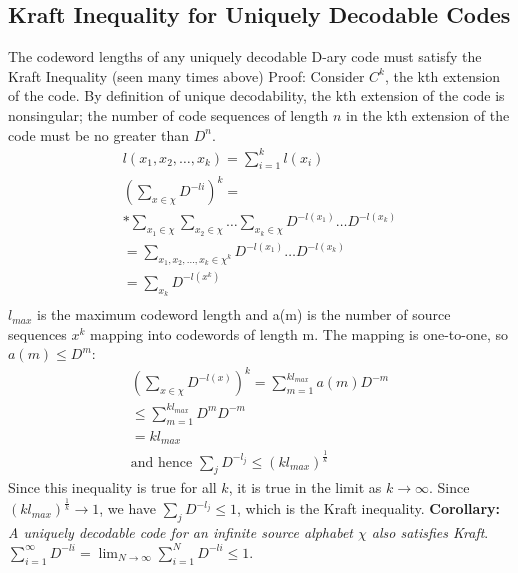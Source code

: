 \documentclass[10pt]{article}
\begin{document}
\begin{tiny}
\begin{multicols}{3}
\section*{Kraft Inequality for Uniquely Decodable Codes}
\thm[McMillan] \label{thm: mcmillan}
The codeword lengths of any uniquely decodable D-ary code must satisfy the Kraft Inequality (seen many times above) \newline
Proof: \newline
Consider ${C^{k}}$, the kth extension of the code. By definition of unique decodability, the kth extension of the code is nonsingular; 
the number of code sequences of length ${n}$ in the kth extension of the code must be no greater than ${D^{n}}$. 
\begin{eqnarray}
l({x_1},{x_2}, \ldots , {x_k}) = \sum_{i=1}^{k} l({x_i})\\
(\sum_{x\in \chi} D^{-li})^{k} = \\*
\sum_{x_1\in\chi}\sum_{x_2\in\chi} \ldots \sum_{x_k\in\chi}  D^{-l({x_1})} \ldots D^{-l({x_k})}\\
=\sum_{{x_1},{x_2}, \ldots , {x_k} \in \chi^{k}}  D^{-l({x_1})}\ldots D^{-l({x_k})} \\
=\sum_{x_k} D^{-l({x^{k}})}\\
\end{eqnarray}
${l_{max}}$ is the maximum codeword length and a(m) is the number of source sequences
${x^{k}}$ mapping into codewords of length m. The mapping is one-to-one, so $a(m) \leq D^{m}$:
\begin{eqnarray}
(\sum_{x\in\chi} D^{-l(x)})^{k} = \sum_{m=1}^{kl_{max}} a(m)D^{-m}\\
\leq \sum_{m=1}^{kl_{max}} D^{m}D^{-m}\\
=kl_{max}\\
\text{and hence } \sum_j D^{-l_j} \leq (kl_{max})^{\frac{1}{k}}
\end{eqnarray}
Since this inequality is true for all ${k}$, it is true in the limit as ${k} \rightarrow \infty$.
Since ${(kl_{max})^{\frac{1}{k}}} \rightarrow 1$, we have \newline
$\sum_j D^{-l_j} \leq 1$, which is the Kraft inequality.\newline
{\bf Corollary: }{\it A uniquely decodable code for an infinite source alphabet $\chi$ also satisfies Kraft}. \newline
$\sum_{i=1}^{\infty}D^{-li} = \lim_{N\rightarrow\infty}\sum_{i=1}^{N}D^{-li} \leq 1$.




\end{multicols}
\end{tiny}
\end{document}
